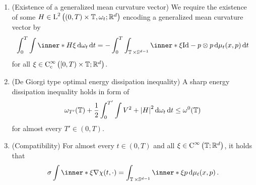 \begin{definition}
\begin{enumerate}
		\item (Existence of a generalized mean curvature vector)
		We require the existence of some 
		$ H \in \operatorname{L}^{ 2 } \left( 
		( 0 , T ) \times \operatorname{\mathbb{T}} , \omega_{ t } ; \mathbb{ R }^{ d } \right) 
		$
		encoding a generalized mean curvature vector by
		\begin{equation}
			\label{equation_varifold_mean_curvature}
			\int_{ 0 }^{ T }
			\int
			\inner*{ H }{ \xi }
			\dd{ \omega_{ t } }
			\dd{ t }
			=
			-
			\int_{ 0 }^{ T }
			\int_{ \flattorus \times \mathbb{ S }^{ d - 1 } }
			\inner*{ \xi }{ \mathrm{Id} - p \otimes p }
			\dd{ \mu_{ t } ( x, p ) }
			\dd{ t }
		\end{equation}
		for all $ \xi \in \operatorname{C}_{ \mathrm{c} }^{ \infty } \left( [ 0, T ) 
		\times \operatorname{\mathbb{T}} ; \mathbb{ R }^{ d } \right) $.
		
		\item (De Giorgi type optimal energy dissipation inequality)
		A sharp energy dissipation inequality holds in form of
		\begin{equation}
			\label{equation_varifold_de_giorgi_inequality}
			\omega_{ T' } ( \operatorname{\mathbb{T}} )
			+
			\frac{ 1 }{ 2 }
			\int_{ 0 }^{ T' }
			\int
			V^{ 2 }
			+
			\abs{ H }^{ 2 }
			\dd{ \omega_{ t } }
			\dd{ t }
			\leq
			\omega^{ 0 } ( \operatorname{\mathbb{T}} )
		\end{equation}
		for almost every $ T' \in ( 0 , T ) $.
		
		\item (Compatibility)
		For almost every $ t \in ( 0 , T ) $ and all $ \xi \in \operatorname{C}^{ 
			\infty } \left( \operatorname{\mathbb{T}} ; \mathbb{ R }^{ d } \right) $, it holds 
			that
		\begin{equation}
			\label{equation_varifold_compatibility}
			\sigma
			\int
			\inner*{ \xi }
			{ \nabla \chi ( t , \cdot ) }
			=
			\int_{ \flattorus \times \mathbb{ S }^{ d - 1 } }
			\inner*{ \xi }{ p }
			\dd{ \mu_{ t } ( x, p ) }.
		\end{equation}
	\end{enumerate}
\end{definition}

